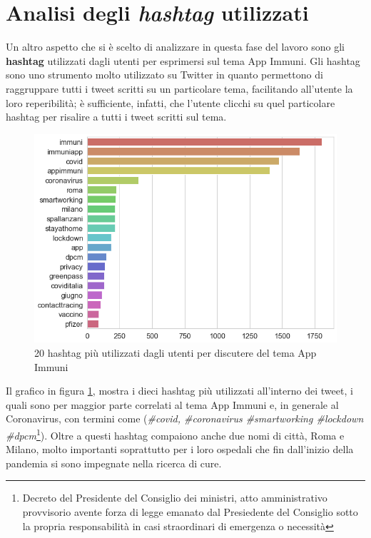 \section{Analisi degli \textit{hashtag} utilizzati}
Un altro aspetto che si è scelto di analizzare in questa fase del lavoro sono gli \textbf{hashtag} utilizzati dagli utenti per esprimersi sul tema App Immuni.
Gli hashtag sono uno strumento molto utilizzato su Twitter in quanto permettono di raggruppare tutti i tweet scritti su un particolare tema, facilitando all'utente la loro reperibilità; è sufficiente, infatti, che l'utente clicchi su quel particolare hashtag per risalire a tutti i tweet scritti sul tema.
\begin{figure} [H]
    \centering
    
    \includegraphics[width = 0.8
    \textwidth]{img/hash_most_freq.jpg}
    \caption{20 hashtag più utilizzati dagli utenti per discutere del tema App Immuni}
    \label{fig:hasht_tweet}
\end{figure}

Il grafico in figura \ref{fig:hasht_tweet}, mostra i dieci hashtag più utilizzati all'interno dei tweet, i quali sono per maggior parte correlati al tema App Immuni e, in generale al Coronavirus, con termini come (\textit{\#covid, \#coronavirus \#smartworking \#lockdown \#dpcm}\footnote{Decreto del Presidente del Consiglio dei ministri, atto amministrativo provvisorio avente forza di legge emanato dal Presiedente del Consiglio sotto la propria responsabilità in casi straordinari di emergenza o necessità}). Oltre a questi hashtag compaiono anche due nomi di città, Roma e Milano, molto importanti soprattutto per i loro ospedali che fin dall'inizio della pandemia si sono impegnate nella ricerca di cure.


